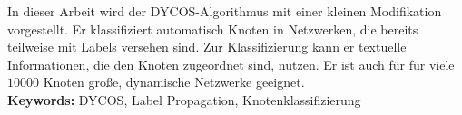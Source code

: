 In dieser Arbeit wird der DYCOS-Algorithmus mit einer kleinen
Modifikation vorgestellt. Er klassifiziert automatisch Knoten in 
Netzwerken, die bereits teilweise mit Labels versehen sind. Zur 
Klassifizierung kann er textuelle Informationen, die den Knoten 
zugeordnet sind, nutzen. Er ist auch für für viele $\num{10000}$ 
Knoten große, dynamische Netzwerke geeignet.\\

\textbf{Keywords:} DYCOS, Label Propagation, Knotenklassifizierung
